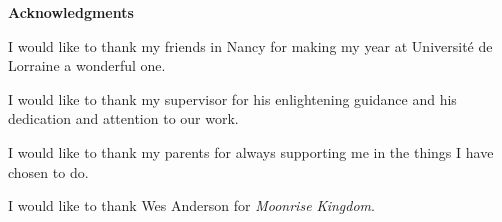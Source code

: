 \vspace{2\baselineskip}

\vspace*{\fill}

\centerline{\textbf{Acknowledgments}}

\vspace{2\baselineskip}

I would like to thank my friends in Nancy for making my year at
Universit\'{e} de Lorraine a wonderful one.

\vspace{\baselineskip}

I would like to thank my supervisor for his enlightening guidance and
his dedication and attention to our work.

\vspace{\baselineskip}

I would like to thank my parents for always supporting me in the things
I have chosen to do.

\vspace{\baselineskip}

\vspace{\baselineskip}

I would like to thank Wes Anderson for \emph{Moonrise Kingdom}.

\vspace*{\fill}
